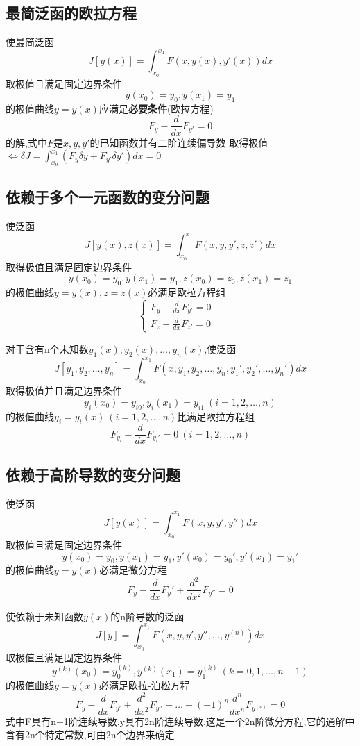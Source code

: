 \subsection{最简泛函的欧拉方程}
\begin{theorem}
使最简泛函
$$J[y(x)]=\int_{x_0}^{x_1}F(x,y(x),y'(x))dx$$
取极值且满足固定边界条件
$$
y(x_0)=y_0,y(x_1)=y_1
$$
的极值曲线$y=y(x)$应满足\textbf{必要条件}(欧拉方程)
$$
F_y - \frac{d}{dx}F_{y'} =0
$$
的解,式中$F$是$x,y,y'$的已知函数并有二阶连续偏导数
取得极值 $\Leftrightarrow \delta J = \int_{x_0}^{x_1}(F_y \delta y + F_{y'} \delta y')dx=0$
\end{theorem}

\subsection{依赖于多个一元函数的变分问题}
\begin{theorem}
使泛函$$J[y(x),z(x)]=\int_{x_0}^{x_1}F(x,y,y',z,z')dx$$取得极值且满足固定边界条件
$$
y(x_0)=y_0,y(x_1)=y_1,z(x_0)=z_0,z(x_1)=z_1
$$
的极值曲线$y=y(x),z=z(x)$必满足欧拉方程组
$$
\left\{
  \begin{array}{ll}
    F_y - \frac{d}{dx}F_{y'}=0 & \\
    F_z - \frac{d}{dx}F_{z'}=0 &
  \end{array}
\right.
$$
\end{theorem}

\begin{corollary}
对于含有n个未知数$y_1(x),y_2(x) ,\ldots , y_n(x)$,使泛函
$$J[y_1,y_2 ,\ldots , y_n]=\int_{x_0}^{x_1}F(x,y_1,y_2 ,\ldots , y_n,y_1',y_2' ,\ldots , y_n')dx$$
取得极值并且满足边界条件
$$y_i(x_0)=y_{i0},y_i(x_1)=y_{i1} ~(i=1,2,\dots,n)$$
的极值曲线$y_i=y_i(x)~ (i=1,2,\dots,n)$比满足欧拉方程组
$$F_{y_i} -  \frac{d}{dx}F_{y_i'}=0 ~(i=1,2,\dots,n)$$
\end{corollary}

\subsection{依赖于高阶导数的变分问题}
\begin{theorem}
使泛函
$$J[y(x)]=\int_{x_0}^{x_1}F(x,y,y',y'')dx$$
取极值且满足固定边界条件
$$
y(x_0)=y_0,y(x_1)=y_1,y'(x_0)=y_0',y'(x_1)=y_1'
$$
的极值曲线$y=y(x)$必满足微分方程
$$F_y - \frac{d}{dx}F_y' + \frac{d^2}{dx^2}F_{y''} = 0 $$
\end{theorem}

\begin{corollary}
使依赖于未知函数$y(x)$的n阶导数的泛函
$$J[y]=\int_{x_0}^{x_1}F(x,y,y',y'', \ldots , y^{(n)})dx$$
取极值且满足固定边界条件
$$
y^{(k)}(x_0)=y_0^{(k)}, y^{(k)}(x_1)=y_1^{(k)} ~ (k= 0,1,\ldots , n-1)
$$
的极值曲线$y=y(x)$必满足欧拉-泊松方程
$$F_y - \frac{d}{dx}F_{y'} + \frac{d^2}{dx^2}F_{y''} - \dots + (-1)^{n}\frac{d^n}{dx^n}F_{y^{(n)}}=0  $$
式中F具有n+1阶连续导数,y具有2n阶连续导数,这是一个2n阶微分方程,它的通解中含有2n个特定常数,可由2n个边界来确定
\end{corollary}

